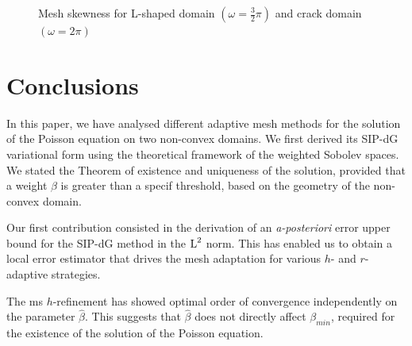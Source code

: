 \documentclass[a4paper,11pt]{article}
\begin{document}
\begin{figure}[h!]\label{tikz:comparison-rate}
\centering
{}
\caption{Mesh skewness for L-shaped domain $(\omega = \frac{3}{2}\pi)$ and crack domain $(\omega = 2\pi)$}
\end{figure}


\clearpage
\newpage

\section{Conclusions}
\label{sec:conclusion}

In this paper, we have analysed different adaptive mesh methods for the solution of the Poisson equation on two non-convex domains. We first derived its SIP-dG variational form using the theoretical framework of the weighted Sobolev spaces. We stated the Theorem of existence and uniqueness of the solution, provided that a weight $\beta$ is greater than a specif threshold, based on the geometry of the non-convex domain. 

Our first contribution consisted in the derivation of an \textit{a-posteriori} error upper bound for the SIP-dG method in the $\operatorname L^{2}$ norm. This has enabled us to obtain a local error estimator that drives the mesh adaptation for various $h$- and $r$-adaptive strategies. 

The ms $h$-refinement has showed optimal order of convergence independently on the parameter $\hat{\beta}$. This suggests that $\hat{\beta}$ does not directly affect $\beta_{min}$, required for the existence of the solution of the Poisson equation.
\end{document}
